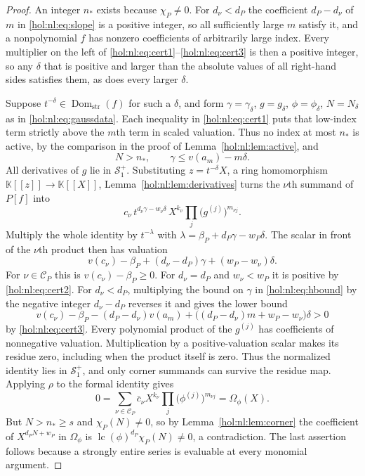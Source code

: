 \documentclass[11pt]{article}
\numberwithin{equation}{section}
\theoremstyle{definition}
\theoremstyle{remark}
\newcommand{\lc}{\operatorname{lc}}
\newcommand{\Dom}{\operatorname{Dom}_{\mathrm{str}}}
\newcommand{\KK}{\mathbb K}
\newcommand{\Sfam}{\mathcal S}
\begin{document}
\begin{proof}
An integer $n_\ast$ exists because $\chi_P\ne0$. For $d_\nu<d_P$ the
coefficient $d_P-d_\nu$ of $m$ in \eqref{hol:nl:eq:slope} is a positive
integer, so all sufficiently large $m$ satisfy it, and a nonpolynomial $f$ has
nonzero coefficients of arbitrarily large index. Every multiplier on the left
of \eqref{hol:nl:eq:cert1}--\eqref{hol:nl:eq:cert3} is then a positive
integer, so any $\delta$ that is positive and larger than the absolute values
of all right-hand sides satisfies them, as does every larger $\delta$.

Suppose $t^{-\delta}\in\Dom(f)$ for such a $\delta$, and form
$\gamma=\gamma_\delta$, $g=g_\delta$, $\phi=\phi_\delta$, $N=N_\delta$ as in
\eqref{hol:nl:eq:gaussdata}. Each inequality in \eqref{hol:nl:eq:cert1}
puts that low-index term strictly above the $m$th term in scaled valuation.
Thus no index at most $n_\ast$ is active, by the comparison in the proof of
Lemma~\ref{hol:nl:lem:active}, and
\begin{equation}\label{hol:nl:eq:hbound}
 N>n_\ast,\qquad \gamma\le v(a_m)-m\delta.
\end{equation}
All derivatives of $g$ lie in $\Sfam_1^+$. Substituting $z=t^{-\delta}X$, a
ring homomorphism $\KK[[z]]\to\KK[[X]]$, Lemma~\ref{hol:nl:lem:derivatives}
turns the $\nu$th summand of $P[f]$ into
\[
 c_\nu\,t^{d_\nu\gamma-w_\nu\delta}\,X^{k_\nu}\prod_j\bigl(g^{(j)}\bigr)^{m_{\nu j}}.
\]
Multiply the whole identity by $t^{-\lambda}$ with
$\lambda=\beta_P+d_P\gamma-w_P\delta$. The scalar in front of the $\nu$th
product then has valuation
\begin{equation}\label{hol:nl:eq:scalarvalue}
 v(c_\nu)-\beta_P+(d_\nu-d_P)\gamma+(w_P-w_\nu)\delta.
\end{equation}
For $\nu\in\mathcal C_P$ this is $v(c_\nu)-\beta_P\ge0$. For $d_\nu=d_P$ and
$w_\nu<w_P$ it is positive by \eqref{hol:nl:eq:cert2}. For $d_\nu<d_P$,
multiplying the bound on $\gamma$ in \eqref{hol:nl:eq:hbound} by the negative
integer $d_\nu-d_P$ reverses it and gives the lower bound
\[
 v(c_\nu)-\beta_P-(d_P-d_\nu)v(a_m)
 +\bigl((d_P-d_\nu)m+w_P-w_\nu\bigr)\delta>0
\]
by \eqref{hol:nl:eq:cert3}. Every polynomial product of the $g^{(j)}$ has
coefficients of nonnegative valuation. Multiplication by a positive-valuation
scalar makes its residue zero, including when the product itself is zero.
Thus the normalized identity lies in $\Sfam_1^+$, and only corner summands
can survive the residue map. Applying $\rho$ to the
formal identity gives
\begin{equation}\label{hol:nl:eq:residualequation}
 0=\sum_{\nu\in\mathcal C_P}\bar c_\nu X^{k_\nu}
 \prod_j\bigl(\phi^{(j)}\bigr)^{m_{\nu j}}=\Omega_\phi(X).
\end{equation}
But $N>n_\ast\ge s$ and $\chi_P(N)\ne0$, so by
Lemma~\ref{hol:nl:lem:corner} the coefficient of $X^{d_PN+w_P}$ in
$\Omega_\phi$ is $\lc(\phi)^{d_P}\chi_P(N)\ne0$, a contradiction. The last
assertion follows because a strongly entire series is evaluable at every
monomial argument.
\end{proof}
\end{document}
